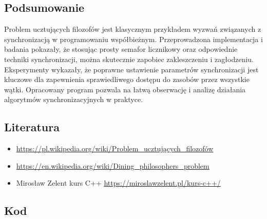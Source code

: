 \documentclass[a4paper,12pt]{article}
\begin{document}
        \subsection{Podsumowanie}
            \vspace{1em}
            Problem ucztujących filozofów jest klasycznym przykładem wyzwań związanych z synchronizacją w programowaniu współbieżnym. Przeprowadzona implementacja i badania pokazały, że stosując prosty semafor licznikowy oraz odpowiednie techniki synchronizacji, można skutecznie zapobiec zakleszczeniu i zagłodzeniu. Eksperymenty wykazały, że poprawne ustawienie parametrów synchronizacji jest kluczowe dla zapewnienia sprawiedliwego dostępu do zasobów przez wszystkie wątki. Opracowany program pozwala na łatwą obserwację i analizę działania algorytmów synchronizacyjnych w praktyce.
            \vspace{1.5em}
        \subsection{Literatura}
            \vspace{1em}
            \begin{itemize}
                \item \url{https://pl.wikipedia.org/wiki/Problem_ucztujących_filozofów}
                \item \url{https://en.wikipedia.org/wiki/Dining_philosophers_problem}
                \item Mirosław Zelent kurs C++ \url{https://miroslawzelent.pl/kurs-c++/}
            \end{itemize}
        \newpage
        \vspace*{2em}
        \subsection{Kod}
            \vspace{1em}
\end{document}
